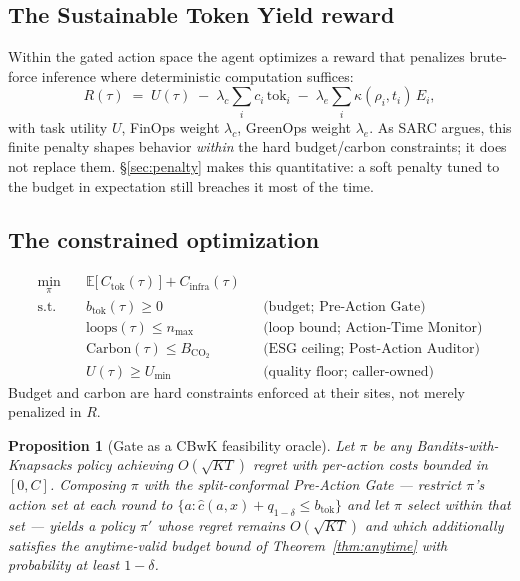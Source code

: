 \documentclass[11pt]{article}
\theoremstyle{plain}
\newtheorem{proposition}{Proposition}
\theoremstyle{definition}
\theoremstyle{remark}
\newcommand{\btok}{b_{\mathrm{tok}}}
\newcommand{\Carbon}{\mathrm{Carbon}}
\begin{document}
\subsection{The Sustainable Token Yield reward}
Within the gated action space the agent optimizes a reward that penalizes brute-force inference where deterministic computation suffices:
\begin{equation}
R(\tau) \;=\; U(\tau)\;-\;\lambda_c \sum_{i} c_i\,\mathrm{tok}_i\;-\;\lambda_e \sum_{i}\kappa(\rho_i,t_i)\,E_i ,
\end{equation}
with task utility $U$, FinOps weight $\lambda_c$, GreenOps weight $\lambda_e$. As SARC argues, this finite penalty shapes behavior \emph{within} the hard budget/carbon constraints; it does not replace them. \S\ref{sec:penalty} makes this quantitative: a soft penalty tuned to the budget in expectation still breaches it most of the time.

\subsection{The constrained optimization}
\begin{equation}
\begin{aligned}
\min_{\pi}\quad & \mathbb{E}\big[\,C_{\mathrm{tok}}(\tau)\,\big] + C_{\mathrm{infra}}(\tau)\\
\text{s.t.}\quad
& \btok(\tau) \ge 0 && \text{(budget; Pre-Action Gate)}\\
& \mathrm{loops}(\tau) \le n_{\max} && \text{(loop bound; Action-Time Monitor)}\\
& \Carbon(\tau) \le B_{\mathrm{CO_2}} && \text{(ESG ceiling; Post-Action Auditor)}\\
& U(\tau) \ge U_{\min} && \text{(quality floor; caller-owned)}
\end{aligned}
\end{equation}
Budget and carbon are hard constraints enforced at their sites, not merely penalized in $R$.

\begin{proposition}[Gate as a CBwK feasibility oracle]\label{prop:cbwk}
Let $\pi$ be any Bandits-with-Knapsacks policy achieving $O(\sqrt{KT})$ regret with per-action costs bounded in $[0,C]$. Composing $\pi$ with the split-conformal Pre-Action Gate --- restrict $\pi$'s action set at each round to $\{a : \hat c(a,x)+q_{1-\delta}\le \btok\}$ and let $\pi$ select within that set --- yields a policy $\pi'$ whose regret remains $O(\sqrt{KT})$ and which additionally satisfies the anytime-valid budget bound of Theorem~\ref{thm:anytime} with probability at least $1-\delta$.
\end{proposition}
\end{document}
